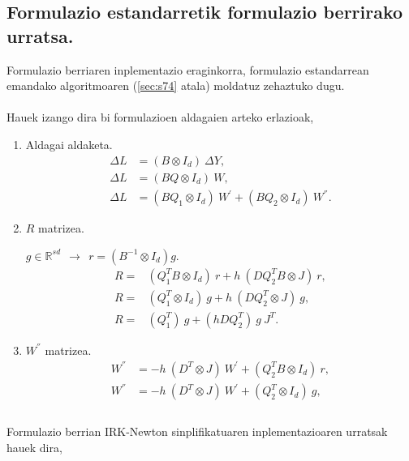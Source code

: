 \subsection*{Formulazio estandarretik formulazio berrirako urratsa.}

Formulazio berriaren inplementazio eraginkorra, formulazio estandarrean emandako algoritmoaren (\ref{sec:s74} atala) moldatuz zehaztuko dugu.

\paragraph*{} Hauek izango dira bi formulazioen aldagaien arteko erlazioak,

\begin{enumerate}

\item Aldagai aldaketa.
\begin{align*}
\Delta L &=(B \otimes I_d) \ \Delta Y, \\
\Delta L &=(B Q \otimes I_d) \ W, \\
\Delta L &=(B Q_1 \otimes I_d) \ W^{'}+(B Q_2 \otimes I_d) \ W^{''}.
\end{align*}

\item $R$ matrizea.

$g \in \mathbb{R}^{sd} \ \  \rightarrow \ \ r=(B^{-1} \otimes I_d) g$.
\begin{align*}
R=&(Q_1^TB \otimes I_d) \ r + h \ (D Q_2^T B \otimes J) \ r ,\\
R=&(Q_1^T \otimes I_d) \ g + h \ (D Q_2^T \otimes J) \ g,  \\
R=& (Q_1^T) \ g  + (h D Q_2^T) \ g \ J^T.
\end{align*}

\item $W^{''}$ matrizea.
\begin{align*}
W^{''}&= -h \ (D^T \otimes J) \ W^{'}+ (Q_2^T B \otimes I_d) \ r, \\
W^{''}&= -h \ (D^T \otimes J) \ W^{'}+ (Q_2^T \otimes I_d) \ g, \\
\end{align*}


\end{enumerate}

\paragraph*{}Formulazio berrian IRK-Newton sinplifikatuaren inplementazioaren urratsak hauek dira,

